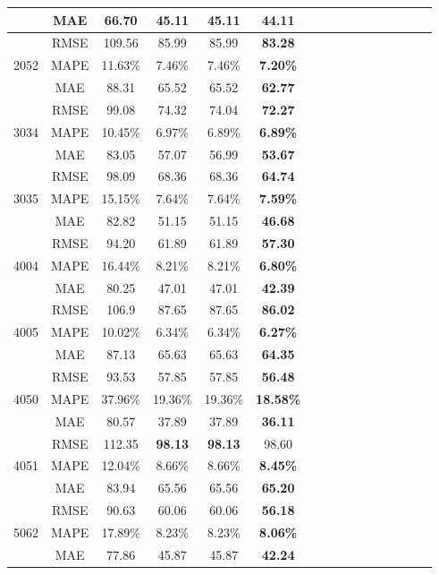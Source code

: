 \documentclass[twocolumn]{article}
\begin{document}
\begin{table}
\begin{tabular}{cccccccccccccccc}
\\
        & MAE & 66.70 & 45.11& 45.11 & \textbf{44.11}\\
        \hline
        \multirow{3}{*}{2052} & RMSE & 109.56 & 85.99 
&85.99 & \textbf{83.28} \\
  & MAPE & 11.63\%& 7.46\%
&7.46\%  & \textbf{7.20\%} \\
& MAE & 88.31 & 65.52 & 65.52 & \textbf{62.77} \\
 \hline
\multirow{3}{*}{3034} & RMSE & 99.08 
 & 74.32 & 74.04 & \textbf{72.27} \\
& MAPE & 10.45\% &6.97\%  &6.89\% & \textbf{6.89\%} \\
& MAE &83.05  & 57.07 & 56.99 & \textbf{53.67} \\
\hline 
\multirow{3}{*}{3035} & RMSE & 98.09 &68.36  & 68.36 & \textbf{64.74} \\
& MAPE &15.15\% & 7.64\% &7.64\% & \textbf{7.59\%} \\
& MAE & 82.82 &51.15  &51.15  & \textbf{46.68}  \\
\hline 
\multirow{3}{*}{4004} & RMSE & 94.20  &61.89 &61.89 &\textbf{57.30}  \\
&MAPE & 16.44\%& 8.21\%& 8.21\%
& \textbf{6.80\%} \\
& MAE &80.25  &47.01  & 47.01 & \textbf{42.39} \\
\hline 
\multirow{3}{*}{4005} & RMSE & 106.9 & 87.65 &87.65 & \textbf{86.02} \\
&MAPE &10.02\% &6.34\% & 6.34\% & \textbf{6.27\%}
\\
& MAE &87.13 & 65.63 &65.63 & \textbf{64.35} \\
\hline 
\multirow{3}{*}{4050} & RMSE & 93.53 &57.85 &57.85 &\textbf{56.48} \\
&MAPE &37.96\% & 19.36\%& 19.36\%&\textbf{18.58\%}
\\
& MAE & 80.57 & 37.89 & 37.89 & \textbf{36.11} \\
\hline 
\multirow{3}{*}{4051} & RMSE &112.35  & \textbf{98.13} &\textbf{98.13}  &98.60 \\
&MAPE &12.04\% &8.66\% & 8.66\% & \textbf{8.45\%} \\
& MAE & 83.94 & 65.56 & 65.56 & \textbf{65.20} \\
\hline 
\multirow{3}{*}{5062} & RMSE &90.63  & 60.06 & 60.06 &\textbf{56.18}  \\
&MAPE & 17.89\%& 8.23\%&8.23\% &\textbf{8.06\%} \\
& MAE &77.86  & 45.87 & 45.87 & \textbf{42.24} \\
\bottomrule

\end{tabular}
\end{table}
\end{document}
